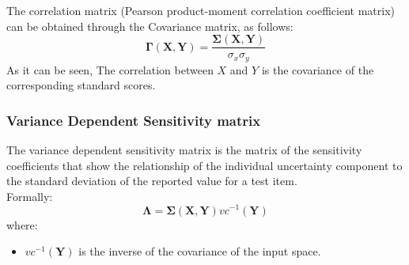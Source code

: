 The correlation matrix (Pearson product-moment correlation coefficient matrix) can be obtained through the Covariance matrix, as follows:
\begin{equation}
\boldsymbol{\Gamma}(\boldsymbol{X},\boldsymbol{Y}) = \frac{\boldsymbol{\Sigma}(\boldsymbol{X},\boldsymbol{Y})}{\sigma_{x} \sigma_{y}}
\end{equation}
As it can be seen, The correlation between $X$ and $Y$ is the 
covariance of the corresponding standard scores.

\subsubsection{Variance Dependent Sensitivity matrix}
The variance dependent sensitivity matrix is the matrix of the sensitivity 
coefficients that show the relationship of the individual uncertainty 
component to the standard deviation of the reported value for a test 
item. 
\\ Formally:
\begin{equation}
\boldsymbol{\Lambda}= \boldsymbol{\Sigma}(\boldsymbol{X},\boldsymbol{Y})  vc^{-1}(\boldsymbol{Y})
\end{equation}
where:
\begin{itemize}
  \item $vc^{-1}(\boldsymbol{Y})$ is the inverse of the covariance of the 
  input space.
\end{itemize}

